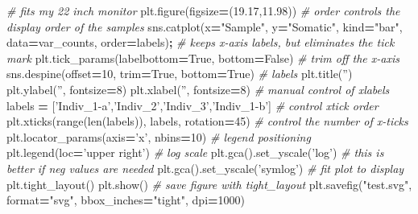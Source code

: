 \documentclass[]{book}
\newenvironment{Shaded}{\begin{snugshade}}{\end{snugshade}}
\newcommand{\BuiltInTok}[1]{#1}
\newcommand{\CommentTok}[1]{\textcolor[rgb]{0.56,0.35,0.01}{\textit{#1}}}
\newcommand{\DecValTok}[1]{\textcolor[rgb]{0.00,0.00,0.81}{#1}}
\newcommand{\FloatTok}[1]{\textcolor[rgb]{0.00,0.00,0.81}{#1}}
\newcommand{\NormalTok}[1]{#1}
\newcommand{\OperatorTok}[1]{\textcolor[rgb]{0.81,0.36,0.00}{\textbf{#1}}}
\newcommand{\StringTok}[1]{\textcolor[rgb]{0.31,0.60,0.02}{#1}}
\newcommand{\VariableTok}[1]{\textcolor[rgb]{0.00,0.00,0.00}{#1}}
\begin{document}
\begin{Shaded}
\begin{Highlighting}[]
\CommentTok{# fits my 22 inch monitor}
\NormalTok{plt.figure(figsize}\OperatorTok{=}\NormalTok{(}\FloatTok{19.17}\NormalTok{,}\FloatTok{11.98}\NormalTok{))}
\CommentTok{# order controls the display order of the samples}
\NormalTok{sns.catplot(x}\OperatorTok{=}\StringTok{"Sample"}\NormalTok{, y}\OperatorTok{=}\StringTok{"Somatic"}\NormalTok{, kind}\OperatorTok{=}\StringTok{"bar"}\NormalTok{, data}\OperatorTok{=}\NormalTok{var_counts, order}\OperatorTok{=}\NormalTok{labels)}\OperatorTok{;}
\CommentTok{# keeps x-axis labels, but eliminates the tick mark}
\NormalTok{plt.tick_params(labelbottom}\OperatorTok{=}\VariableTok{True}\NormalTok{, bottom}\OperatorTok{=}\VariableTok{False}\NormalTok{)}
\CommentTok{# trim off the x-axis}
\NormalTok{sns.despine(offset}\OperatorTok{=}\DecValTok{10}\NormalTok{, trim}\OperatorTok{=}\VariableTok{True}\NormalTok{, bottom}\OperatorTok{=}\VariableTok{True}\NormalTok{)}
\CommentTok{# labels}
\NormalTok{plt.title(}\StringTok{''}\NormalTok{)}
\NormalTok{plt.ylabel(}\StringTok{''}\NormalTok{, fontsize}\OperatorTok{=}\DecValTok{8}\NormalTok{)}
\NormalTok{plt.xlabel(}\StringTok{''}\NormalTok{, fontsize}\OperatorTok{=}\DecValTok{8}\NormalTok{)}
\CommentTok{# manual control of xlabels}
\NormalTok{labels }\OperatorTok{=}\NormalTok{ [}\StringTok{'Indiv_1-a'}\NormalTok{,}\StringTok{'Indiv_2'}\NormalTok{,}\StringTok{'Indiv_3'}\NormalTok{,}\StringTok{'Indiv_1-b'}\NormalTok{]}
\CommentTok{# control xtick order}
\NormalTok{plt.xticks(}\BuiltInTok{range}\NormalTok{(}\BuiltInTok{len}\NormalTok{(labels)), labels, rotation}\OperatorTok{=}\DecValTok{45}\NormalTok{)}
\CommentTok{# control the number of x-ticks}
\NormalTok{plt.locator_params(axis}\OperatorTok{=}\StringTok{'x'}\NormalTok{, nbins}\OperatorTok{=}\DecValTok{10}\NormalTok{)}
\CommentTok{# legend positioning}
\NormalTok{plt.legend(loc}\OperatorTok{=}\StringTok{'upper right'}\NormalTok{)}
\CommentTok{# log scale}
\NormalTok{plt.gca().set_yscale(}\StringTok{'log'}\NormalTok{)}
\CommentTok{# this is better if neg values are needed}
\NormalTok{plt.gca().set_yscale(}\StringTok{'symlog'}\NormalTok{)}
\CommentTok{# fit plot to display}
\NormalTok{plt.tight_layout()}
\NormalTok{plt.show()}
\CommentTok{# save figure with tight_layout}
\NormalTok{plt.savefig(}\StringTok{"test.svg"}\NormalTok{, }\BuiltInTok{format}\OperatorTok{=}\StringTok{"svg"}\NormalTok{, bbox_inches}\OperatorTok{=}\StringTok{"tight"}\NormalTok{, dpi}\OperatorTok{=}\DecValTok{1000}\NormalTok{)}
\end{Highlighting}
\end{Shaded}
\end{document}

